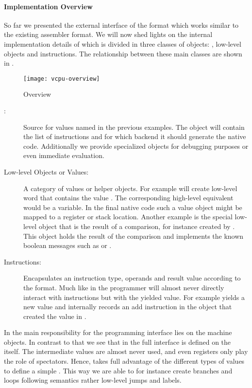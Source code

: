 \paragraph{\VCPU Implementation Overview}
So far we presented the external interface of the \VCPU format which works similar to the existing \B assembler format.
We will now shed lights on the internal implementation details of \VCPU which is divided in three classes of objects: \CPUs, low-level objects and instructions.
The relationship between these main classes are shown in .
%
\begin{figure}[h]
	\centering
	\texttt{[image: vcpu-overview]}
	\caption{\VCPU Overview}
\end{figure}
%
\begin{description}
	\item[\CPUs:] Source for values named  in the previous examples.
	The \CPU object will contain the list of instructions and for which backend it should generate the native code.
	Additionally we provide specialized \CPU objects for debugging purposes or even immediate evaluation.
	
	\item[Low-level Objects or Values:] A category of values or helper objects.
	For example  will create low-level word that contains the value .
	The corresponding high-level equivalent would be a variable.
	In the final native code such a value object might be mapped to a register or stack location.
	Another example is the special low-level object that is the result of a comparison, for instance created by .
	This object holds the result of the comparison and implements the known boolean messages such as  or .
			
	\item[Instructions:] Encapsulates an instruction type, operands and result value according to the \TAC format.
	Much like in \PH the programmer will almost never directly interact with instructions but with the yielded value. 
	For example  yields a new \VCPU value and internally records an add instruction in the \CPU object that created the value in .
\end{description}

\noindent In \VCPU the main responsibility for the programming interface lies on the machine objects.
In contrast to that we see that in \AsmJit the full interface is defined on the \ASM itself.
The intermediate values are almost never used, and even registers only play the role of spectators.
Hence, \VCPU takes full advantage of the different types of values to define a simple \DSL.
This way we are able to for instance create branches and loops following \PH semantics rather low-level jumps and labels. 


